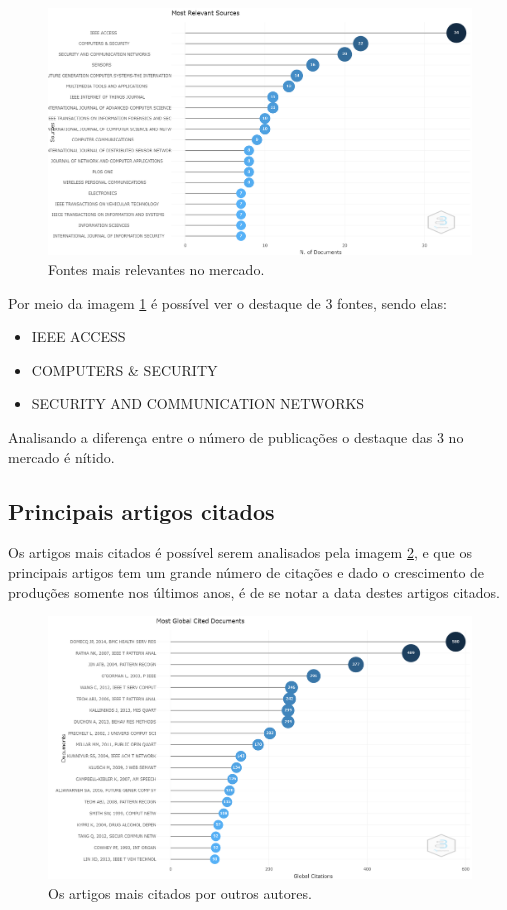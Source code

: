 \begin{figure}
    \centering
    \includegraphics[width=1\textwidth]{experiments/AllannH/PesquisaBibliometrica/Imagens/TSW-AllannH-fontes_relevantes.png}
    \caption{Fontes mais relevantes no mercado.}
    \label{fig:AllannH-fontes_relevantes}
\end{figure}
Por meio da imagem \ref{fig:AllannH-fontes_relevantes} é possível ver o destaque de 3 fontes, sendo elas:
\begin{itemize}
\item IEEE ACCESS
\item COMPUTERS & SECURITY
\item SECURITY AND COMMUNICATION NETWORKS
\end{itemize}
Analisando a diferença entre o número de publicações o destaque das 3 no mercado é nítido.

\subsection{Principais artigos citados}
Os artigos mais citados é possível serem analisados pela imagem \ref{fig:AllannH-artigos_citados}, e que os principais artigos tem um grande número de citações e dado o crescimento de produções somente nos últimos anos, é de se notar a data destes artigos citados.

\begin{figure}
    \centering
    \includegraphics[width=1\textwidth]{experiments/AllannH/PesquisaBibliometrica/Imagens/TSW-AllannH-artigos_citados.png}
    \caption{Os artigos mais citados por outros autores.}
    \label{fig:AllannH-artigos_citados}
\end{figure}

